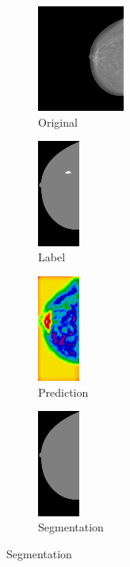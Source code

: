 \documentclass{beamer}
\begin{document}
\begin{frame}
\begin{figure}[h]
\begin{subfigure}{0.25\textwidth}
				\centering
					\includegraphics[height = 3.5cm]{plots/mammogram_ex2.png}
				\caption{Original}
			\end{subfigure}
			\begin{subfigure}{0.16\textwidth}
				\centering
					\includegraphics[height = 3.5cm]{plots/label_ex2.png}
				\caption{Label}
			\end{subfigure}
			\begin{subfigure}{0.16\textwidth}
				\centering
					\includegraphics[height = 3.5cm]{plots/logits_ex2_v1.png}
				\caption{Prediction}
			\end{subfigure}
			\begin{subfigure}{0.22\textwidth}
				\centering
					\includegraphics[height = 3.5cm]{plots/segmentation_ex2_v1.png}
				\caption{Segmentation}
			\end{subfigure}%
		\end{figure}		
	\end{frame}
	
\end{document}
